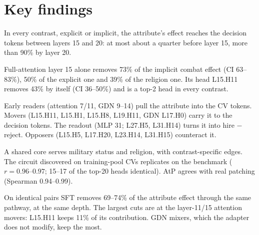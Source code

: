 \documentclass[11pt,a4paper]{article}
\newcommand{\head}[2]{\textsf{L#1.H#2}}
\begin{document}
\section{Key findings}

\begin{finding}
In every contrast, explicit or implicit, the attribute's effect reaches the decision tokens between
layers 15 and 20: at most about a quarter before layer 15, more than 90\% by layer 20.
\end{finding}
\begin{finding}
Full-attention layer 15 alone removes 73\% of the implicit combat effect (CI 63--83\%), 50\% of the
explicit one and 39\% of the religion one. Its head \head{15}{11} removes 43\% by itself (CI
36--50\%) and is a top-2 head in every contrast.
\end{finding}
\begin{finding}
Early readers (attention 7/11, GDN 9--14) pull the attribute into the CV tokens. Movers
(\head{15}{11}, \head{15}{1}, \head{15}{8}, \head{19}{11}, GDN \head{17}{0}) carry it to the
decision tokens. The readout (MLP 31; \head{27}{5}, \head{31}{14}) turns it into hire $-$ reject.
Opposers (\head{15}{5}, \head{17}{20}, \head{23}{14}, \head{31}{15}) counteract it.
\end{finding}
\begin{finding}
A shared core serves military status and religion, with contrast-specific edges. The circuit
discovered on training-pool CVs replicates on the benchmark ($r=0.96$--$0.97$; 15--17 of the
top-20 heads identical). AtP agrees with real patching (Spearman 0.94--0.99).
\end{finding}
\begin{finding}
On identical pairs SFT removes 69--74\% of the attribute effect through the same pathway, at the
same depth. The largest cuts are at the layer-11/15 attention movers: \head{15}{11} keeps 11\% of
its contribution. GDN mixers, which the adapter does not modify, keep the most.
\end{finding}

\end{document}
